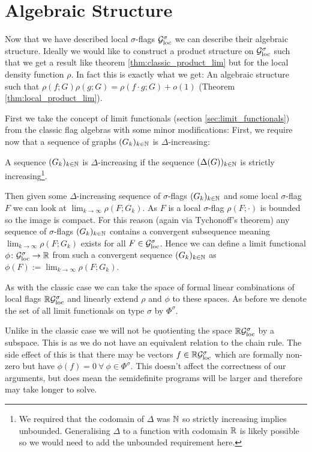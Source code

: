 \section{Algebraic Structure}

Now that we have described local $\sigma$-flags $\mathcal{G}_\mathrm{loc}^\sigma$ we can describe their
algebraic structure. Ideally we would like to construct a product structure
on $\mathcal{G}_\mathrm{loc}^\sigma$ such that we get a result like theorem \ref{thm:classic_product_lim} but for
the local density function $\rho$. In fact this is exactly what we get: An algebraic structure such
that $\rho(f; G)\rho(g;G) = \rho(f\cdot g; G) + o(1)$ (Theorem \ref{thm:local_product_lim}).

First we take the concept of limit functionals (section \ref{sec:limit_functionals})
from the classic flag algebras with some minor modifications:
First, we require now that a sequence of graphs $(G_k)_{k\in\mathbb{N}}$ is $\Delta$-increasing:
\begin{definition}
    A sequence $(G_k)_{k\in\mathbb{N}}$ is $\Delta$-increasing if the sequence
    $(\Delta(G))_{k\in\mathbb{N}}$ is strictly increasing\footnote{We required that the codomain of
    $\Delta$ was $\mathbb{N}$ so strictly increasing implies unbounded. Generalising $\Delta$
    to a function with codomain $\mathbb{R}$ is likely possible so we would need to add the
    unbounded requirement here.}.
\end{definition}
Then given some $\Delta$-increasing sequence of $\sigma$-flags $(G_k)_{k\in\mathbb{N}}$
and some local $\sigma$-flag
$F$ we can look at $\lim_{k\to\infty}\rho(F; G_k)$. As $F$ is a local $\sigma$-flag
$\rho(F; \cdot)$ is bounded so the image is compact. For this reason (again via Tychonoff's theorem)
any sequence of $\sigma$-flags $(G_k)_{k\in\mathbb{N}}$ contains a convergent subsequence meaning
$\lim_{k\to\infty}\rho(F; G_k)$ exists for all $F\in\mathcal{G}_\mathrm{loc}^\sigma$.
Hence we can define a limit functional $\phi\colon\mathcal{G}_\mathrm{loc}^\sigma\to\mathbb{R}$
from such a convergent sequence $(G_k)_{k\in\mathbb{N}}$ as $\phi(F):=\lim_{k\to\infty}\rho(F; G_k)$.

As with the classic case we can take the space of formal linear combinations of
local flags $\mathbb{R}\mathcal{G}_\mathrm{loc}^\sigma$ and linearly extend $\rho$ and $\phi$ to these
spaces. As before we denote the set of all limit functionals on type $\sigma$ by
$\Phi^\sigma$.

\begin{note}
    Unlike in the classic case we will not be quotienting the space $\mathbb{R}\mathcal{G}_\mathrm{loc}^\sigma$ by
    a subspace. This is as we do not have an equivalent relation to the chain rule.
    The side effect of this is that there may be vectors $f \in \mathbb{R}\mathcal{G}_\mathrm{loc}^\sigma$ which
    are formally non-zero but have $\phi(f) = 0\ \forall\ \phi\in\Phi^\sigma$.
    This doesn't affect the correctness of our arguments, but does mean the semidefinite
    programs will be larger and therefore may take longer to solve.
\end{note}

